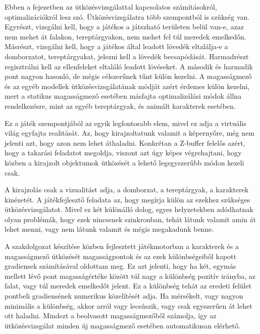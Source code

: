 \label{Chap:utkozesvizsgalat}

Ebben a fejezetben az ütközésvizsgálattal kapcsolatos számításokról, optimalizációkról lesz szó. Ütközésvizsgálatra több szempontból is szükség van. Egyrészt, vizsgálni kell, hogy a játékos a játszható területen belül van-e, azaz nem mehet át falakon, tereptárgyakon, nem mehet fel túl meredek emelkedőn. Másrészt, vizsgálni kell, hogy a játékos által leadott lövedék eltalálja-e a domborzatot, tereptárgyakat, jelezni kell a lövedék becsapódását. Harmadrészt regisztrálni kell az ellenfeleket eltaláló leadott lövéseket. A második és harmadik pont nagyon hasonló, de mégis célszerűnek tűnt külön kezelni. A magasságmező és az egyéb modellek ütközésvizsgálatának módját azért érdemes külön kezelni, mert a statikus magasságmező esetében másfajta optimalizálási módok állna rendelkezésre, mint az egyéb tereptárgyak, és animált karakterek esetében.


Ez a játék szempontjából az egyik legfontosabb elem, mivel ez adja a virtuális világ egyfajta realitását. Az, hogy kirajzoltatunk valamit a képernyőre, még nem jelenti azt, hogy azon nem lehet áthaladni. Konkrétan a Z-buffer felelős azért, hogy a takarási feladatot megoldja, viszont azt úgy képes végrehajtani, hogy közben a kirajzolt objektumok ütközését a lehető legegyszerűbb módon kezeli csak.

A kirajzolás csak a vizualitást adja, a domborzat, a tereptárgyak, a karakterek kinézetét. A játékfejlesztő feladata az, hogy megírja külön az ezekhez szükséges ütközésvizsgálatot. Mivel ez két különálló dolog, egyes helyzetekben adódhatnak olyan problémák, hogy ezek nincsenek szinkronban, tehát látunk valamit amin át lehet menni, vagy nem látunk valamit és mégis megakadunk benne.

A szakdolgozat készítése közben fejlesztett játékmotorban a karakterek és a magasságmező ütközését magasságpontok és az ezek különbségeiből kapott gradiensek számításával oldottam meg. Ez azt jelenti, hogy ha két, egymás mellett lévő pont magasságértéke között túl nagy a különbség pozitív irányba, az falat, vagy túl meredek emelkedőt jelent. Ez a különbség tehát az eredeti felület pontbeli gradiensének numerikus közelítését adja. Ha mérsékelt, vagy nagyon minimális a különbség, akkor arról vagy lecsúszik, vagy csak egyszerűen át lehet ott haladni. Mindezt a beolvasott magasságmezőből számolja, így az ütközésvizsgálat minden új magasságmező esetében automatikusan elérhető.


